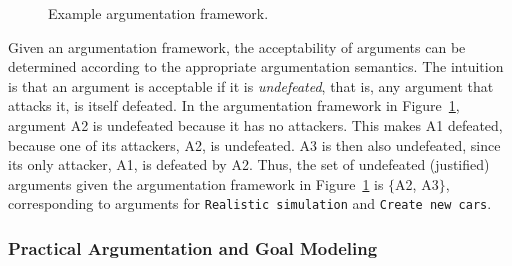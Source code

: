 \begin{figure}[ht!]
\centering
{}
\caption{Example argumentation framework.}
\label{fig:pras:example}
\end{figure}


Given an argumentation framework, the acceptability of arguments can be determined according to the appropriate argumentation semantics. The intuition is that an argument is acceptable if it is \emph{undefeated}, that is, any argument that attacks it, is itself defeated. In the argumentation framework in Figure~\ref{fig:pras:example}, argument A2 is undefeated because it has no attackers. This makes A1 defeated, because one of its attackers, A2, is undefeated. A3 is then also undefeated, since its only attacker, A1, is defeated by A2. Thus, the set of undefeated (justified) arguments given the argumentation framework in Figure~\ref{fig:pras:example} is $\{$A2, A3$\}$, corresponding to arguments for \texttt{Realistic simulation} and \texttt{Create new cars}.

\subsubsection*{Practical Argumentation and Goal Modeling}
\label{sect:background:pras:motivation}

